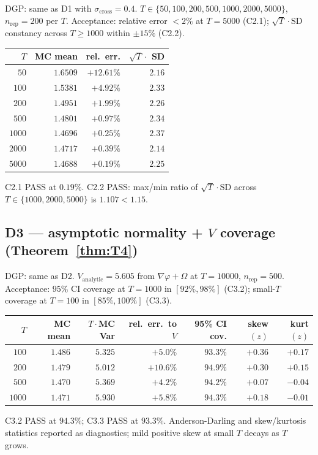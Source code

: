 \documentclass[11pt,letterpaper]{article}
\theoremstyle{remark}
\begin{document}
DGP: same as D1 with $\sigma_{\mathrm{cross}} = 0.4$. $T \in \{50, 100, 200, 500, 1000, 2000, 5000\}$, $n_{\mathrm{rep}} = 200$ per $T$. Acceptance: relative error $< 2\%$ at $T = 5000$ (C2.1); $\sqrt{T} \cdot \mathrm{SD}$ constancy across $T \ge 1000$ within $\pm 15\%$ (C2.2).
\begin{center}
\begin{tabular}{rrrr}
\toprule
$T$ & MC mean & rel.\ err. & $\sqrt{T} \cdot$ SD \\
\midrule
$50$ & $1.6509$ & $+12.61\%$ & $2.16$ \\
$100$ & $1.5381$ & $+4.92\%$ & $2.33$ \\
$200$ & $1.4951$ & $+1.99\%$ & $2.26$ \\
$500$ & $1.4801$ & $+0.97\%$ & $2.34$ \\
$1000$ & $1.4696$ & $+0.25\%$ & $2.37$ \\
$2000$ & $1.4717$ & $+0.39\%$ & $2.14$ \\
$5000$ & $1.4688$ & $+0.19\%$ & $2.25$ \\
\bottomrule
\end{tabular}
\end{center}
C2.1 PASS at $0.19\%$. C2.2 PASS: max/min ratio of $\sqrt{T} \cdot \mathrm{SD}$ across $T \in \{1000, 2000, 5000\}$ is $1.107 < 1.15$.

\subsection{\texorpdfstring{D3 --- asymptotic normality + $V$ coverage (Theorem~\ref{thm:T4})}{D3 --- asymptotic normality + V coverage (Theorem 4)}}

DGP: same as D2. $V_{\mathrm{analytic}} = 5.605$ from $\nabla \varphi + \widehat\Omega$ at $T = 10000$, $n_{\mathrm{rep}} = 500$. Acceptance: $95\%$ CI coverage at $T = 1000$ in $[92\%, 98\%]$ (C3.2); small-$T$ coverage at $T = 100$ in $[85\%, 100\%]$ (C3.3).
\begin{center}
\begin{tabular}{rrrrrrr}
\toprule
$T$ & MC mean & $T \cdot$MC Var & rel.\ err.\ to $V$ & 95\% CI cov. & skew$(z)$ & kurt$(z)$ \\
\midrule
$100$ & $1.486$ & $5.325$ & $+5.0\%$ & $93.3\%$ & $+0.36$ & $+0.17$ \\
$200$ & $1.479$ & $5.012$ & $+10.6\%$ & $94.9\%$ & $+0.30$ & $+0.15$ \\
$500$ & $1.470$ & $5.369$ & $+4.2\%$ & $94.2\%$ & $+0.07$ & $-0.04$ \\
$1000$ & $1.471$ & $5.930$ & $+5.8\%$ & $\mathbf{94.3\%}$ & $+0.18$ & $-0.01$ \\
\bottomrule
\end{tabular}
\end{center}
C3.2 PASS at $94.3\%$; C3.3 PASS at $93.3\%$. Anderson-Darling and skew/kurtosis statistics reported as diagnostics; mild positive skew at small $T$ decays as $T$ grows.
\end{document}
